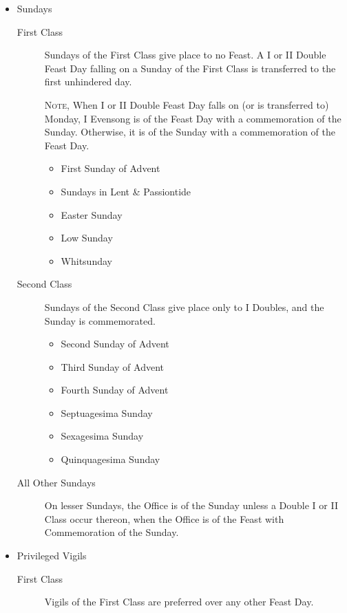 \begin{itemize}
    \item Sundays
        \begin{description}
            \item[First Class] Sundays of the First Class give place to no Feast. A I or II Double Feast Day falling on a Sunday of the First Class is transferred to the first unhindered day.\par
            \textsc{Note,} When I or II Double Feast Day falls on (or is transferred to) Monday, I Evensong is of the Feast Day with a commemoration of the Sunday. Otherwise, it is of the Sunday with a commemoration of the Feast Day.
                \begin{itemize}
                    \item First Sunday of Advent
                    \item Sundays in Lent \& Passiontide
                    \item Easter Sunday
                    \item Low Sunday
                    \item Whitsunday
                \end{itemize}
            \item[Second Class] Sundays of the Second Class give place only to I Doubles, and the Sunday is commemorated.
                \begin{itemize}
                    \item Second Sunday of Advent
                    \item Third Sunday of Advent
                    \item Fourth Sunday of Advent
                    \item Septuagesima Sunday
                    \item Sexagesima Sunday
                    \item Quinquagesima Sunday
                \end{itemize}
            \item[All Other Sundays] On lesser Sundays, the Office is of the Sunday unless a Double I or II Class occur thereon, when the Office is of the Feast with Commemoration of the Sunday.
        \end{description}
    \item Privileged Vigils\par
        \begin{description}
            \item[First Class] Vigils of the First Class are preferred over any other Feast Day.

\end{description}
\end{itemize}
